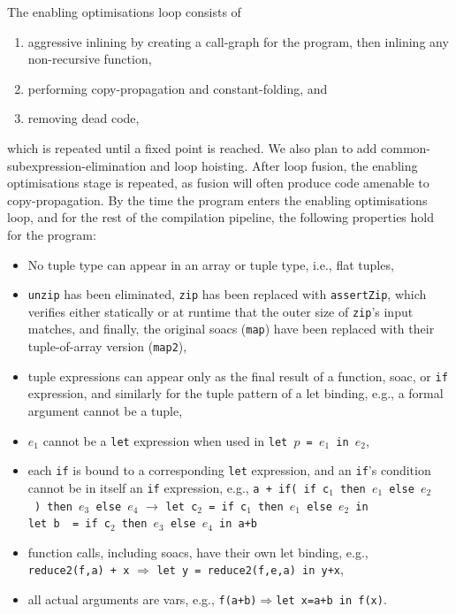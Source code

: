 \documentclass{sigplanconf}  %
\begin{document}
The enabling optimisations loop consists of
\begin{enumerate}
\item aggressive inlining by creating a call-graph for the program,
  then inlining any non-recursive function,
\item performing copy-propagation and constant-folding, and
\item removing dead code,
\end{enumerate}
which is repeated until a fixed point is reached.  We also plan to add
common-subexpression-elimination and loop hoisting.  After loop
fusion, the enabling optimisations stage is repeated, as fusion will
often produce code amenable to copy-propagation.  By the time the
program enters the enabling optimisations loop, and for the rest of
the compilation pipeline, the following properties hold for the
program:

\begin{itemize}
\item No tuple type can appear in an array or tuple type, i.e., flat tuples,
\item {\tt unzip} has been eliminated, {\tt zip} has been
  replaced with {\tt assertZip}, which verifies either
  statically or at runtime that the outer size of {\tt zip}'s
  input matches, and finally, the original {\sc soac}s ({\tt map})
  have been replaced with their tuple-of-array version ({\tt map2}),
\item tuple expressions can appear only as the final result of
  a function, {\sc soac}, or {\tt if} expression, and similarly
  for the tuple pattern of a let binding, e.g., a formal argument
  cannot be a tuple,
\item %
  $e_1$ cannot be a {\tt let} expression when used 
  in {\tt let~$p$~=~$e_1$~in~$e_2$},
\item each {\tt if} is bound to a corresponding {\tt let} expression, and an
  {\tt if}'s condition cannot be in itself an {\tt if} expression, e.g.,
  {\tt a~+~if(~if~c$_1$~then~$e_1$~else~$e_2$~)~then~$e_3$~else~$e_4$} $\rightarrow$
  {\tt let~c$_2$~=~if~c$_1$~then~$e_1$~else~$e_2$~in}\\
  {\tt let~b~~=~if~c$_2$~then~$e_3$~else~$e_4$~in~a+b}
\item function calls, including {\sc soac}s, have their own let binding,
  e.g., {\tt reduce2(f,a)~+~x} $\Rightarrow$
  {\tt let~y~=~reduce2(f,e,a)~in~y+x},
\item all actual arguments are vars,
  e.g., {\tt f(a+b)}$\Rightarrow${\tt let~x=a+b~in~f(x)}.
\end{itemize}
\end{document}
